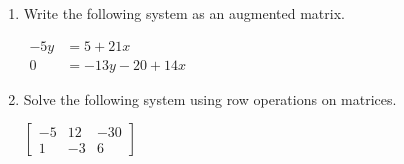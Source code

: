 \documentclass[11pt]{article}
\begin{document}
\begin{enumerate}
% 

\item %
\providecommand{\stxKnowl}{}\renewcommand{\stxKnowl}[1]{#1}
\providecommand{\stxOuttro}{}\renewcommand{\stxOuttro}[1]{#1}
\providecommand{\stxTitle}{}\renewcommand{\stxTitle}[1]{#1}
\renewcommand{\stxOuttro}[1]{}
\stxKnowl{
Write the following system as an augmented matrix.

\(\begin{aligned} -5y &= 5 + 21x \\ 0 &= -13y - 20 + 14x \end{aligned}\)

\stxOuttro{
Solution

\[\begin{aligned} -21x - 5y &= 5 \\ -14x + 13y &= -20 \end{aligned}\]

\[\boxed{ \left[\begin{array}{cc|c} -21 & -5 & 5 \\ -14 & 13 & -20 \end{array}\right] }\]

}
}

\newpage

% 

\item %
\providecommand{\stxKnowl}{}\renewcommand{\stxKnowl}[1]{#1}
\providecommand{\stxOuttro}{}\renewcommand{\stxOuttro}[1]{#1}
\providecommand{\stxTitle}{}\renewcommand{\stxTitle}[1]{#1}
\renewcommand{\stxOuttro}[1]{}
\stxKnowl{
Solve the following system using row operations on matrices.

\(\left[\begin{array}{cc|c} -5 & 12 & -30 \\ 1 & -3 & 6 \end{array}\right]\)

\stxOuttro{
Solution

}}
\end{enumerate}
\end{document}

